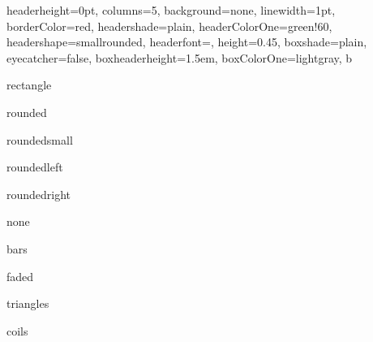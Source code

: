 \documentclass[portrait,fontscale=1,margin=0.2cm,paperwidth=15truecm, paperheight=3.5cm,debug]{baposter}
\begin{document}
\begin{poster}{
  headerheight=0pt,
  columns=5,
  background=none,
  linewidth=1pt,
  borderColor=red,
  headershade=plain,
  headerColorOne=green!60,
  headershape=smallrounded,
  headerfont={},
  height=0.45,
  boxshade=plain,
  eyecatcher=false,
  boxheaderheight=1.5em,
  boxColorOne=lightgray,
}{}{b}{}{}

\begin{posterbox}[column=0,textborder=rectangle]{ }
rectangle
\end{posterbox}

\begin{posterbox}[column=1,textborder=rounded]{ }
rounded
\end{posterbox}

\begin{posterbox}[column=2,textborder=roundedsmall]{ }
roundedsmall
\end{posterbox}

\begin{posterbox}[column=3,textborder=roundedleft]{ }
roundedleft
\end{posterbox}

\begin{posterbox}[column=4,textborder=roundedright]{ }
roundedright
\end{posterbox}




\begin{posterbox}[column=0,row=0.55,textborder=none]{ }
none
\end{posterbox}

\begin{posterbox}[column=1,row=0.55,textborder=bars]{ }
bars
\end{posterbox}

\begin{posterbox}[column=2,row=0.55,textborder=faded]{ }
faded
\end{posterbox}

\begin{posterbox}[column=3,row=0.55,textborder=triangles]{ }
triangles
\end{posterbox}

\begin{posterbox}[column=4,row=0.55,linewidth=0.5pt,textborder=coils]{ }
coils
\end{posterbox}

\end{poster}
\end{document}

